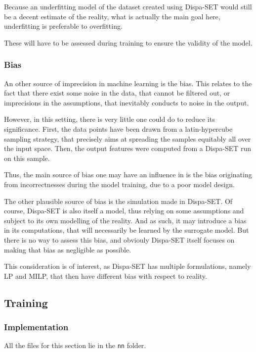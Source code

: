 Because an underfitting model of the dataset created using Dispa-SET would still be a decent estimate of the reality, what is actually the main goal here, underfitting is preferable to overfitting.

These will have to be assessed during training to ensure the validity of the model.

\subsubsection{Bias\label{ssec:bias}}

An other source of imprecision in machine learning is the bias. This relates to the fact that there exist some noise in the data, that cannot be filtered out, or imprecisions in the assumptions, that inevitably conducts to noise in the output.

However, in this setting, there is very little one could do to reduce its significance. First, the data points have been drawn from a latin-hypercube sampling strategy, that precisely aims at spreading the samples equitably all over the input space. Then, the output features were computed from a Dispa-SET run on this sample.

Thus, the main source of bias one may have an influence in is the bias originating from incorrectnesses during the model training, due to a poor model design.

The other plausible source of bias is the simulation made in Dispa-SET. Of course, Dispa-SET is also itself a model, thus relying on some assumptions and subject to its own modelling of the reality. And as such, it may introduce a bias in its computations, that will necessarily be learned by the surrogate model. But there is no way to assess this bias, and obviouly Dispa-SET itself focuses on making that bias as negligible as possible.

This consideration is of interest, as Dispa-SET has multiple formulations, namely LP and MILP, that then have different bias with respect to reality.

\subsection{Training}

\subsubsection{Implementation}

All the files for this section lie in the \texttt{nn} folder.

